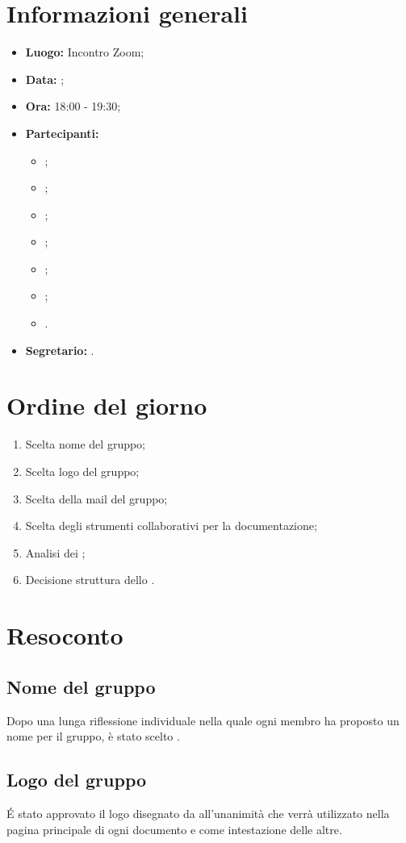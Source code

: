 \section{Informazioni generali}
\begin{itemize}
\item \textbf{Luogo:} Incontro Zoom;
\item \textbf{Data:} \Data;
\item \textbf{Ora:} 18:00 - 19:30;
\item \textbf{Partecipanti:}
	\begin{itemize}
		\item \BL{}; 
		\item \FF{};
		\item \MM{}; 
		\item \PC{};
		\item \TG{};
		\item \TL{};
		\item \VD{}.
	\end{itemize} 
\item \textbf{Segretario:} \PC{}.
\end{itemize}

\section{Ordine del giorno}
\begin{enumerate}
 \item Scelta nome del gruppo;
 \item Scelta logo del gruppo;
 \item Scelta della mail del gruppo;
 \item Scelta degli strumenti collaborativi per la documentazione;
 \item Analisi dei ;
 \item Decisione struttura dello \SdF.
\end{enumerate}

\section{Resoconto}
\subsection{Nome del gruppo}
Dopo una lunga riflessione individuale nella quale ogni membro ha proposto un nome per il gruppo, è stato scelto {\Gruppo}.
\subsection{Logo del gruppo}
É stato approvato il logo disegnato da \TG{} all'unanimità che verrà utilizzato nella pagina principale di ogni documento e come intestazione delle altre.
